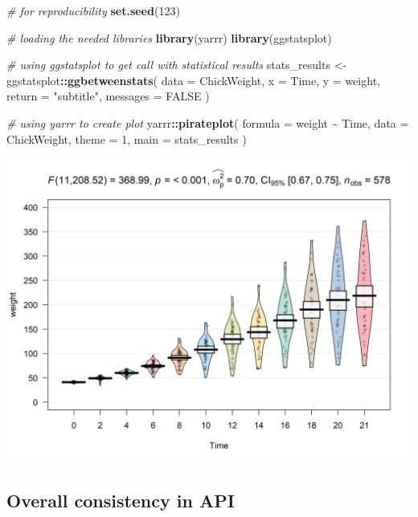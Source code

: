 \documentclass[
]{article}
\newenvironment{Shaded}{\begin{snugshade}}{\end{snugshade}}
\newcommand{\CommentTok}[1]{\textcolor[rgb]{0.56,0.35,0.01}{\textit{#1}}}
\newcommand{\DataTypeTok}[1]{\textcolor[rgb]{0.13,0.29,0.53}{#1}}
\newcommand{\DecValTok}[1]{\textcolor[rgb]{0.00,0.00,0.81}{#1}}
\newcommand{\KeywordTok}[1]{\textcolor[rgb]{0.13,0.29,0.53}{\textbf{#1}}}
\newcommand{\NormalTok}[1]{#1}
\newcommand{\OperatorTok}[1]{\textcolor[rgb]{0.81,0.36,0.00}{\textbf{#1}}}
\newcommand{\OtherTok}[1]{\textcolor[rgb]{0.56,0.35,0.01}{#1}}
\newcommand{\StringTok}[1]{\textcolor[rgb]{0.31,0.60,0.02}{#1}}
\begin{document}
\begin{Shaded}
\begin{Highlighting}[]
\CommentTok{\# for reproducibility}
\KeywordTok{set.seed}\NormalTok{(}\DecValTok{123}\NormalTok{)}

\CommentTok{\# loading the needed libraries}
\KeywordTok{library}\NormalTok{(yarrr)}
\KeywordTok{library}\NormalTok{(ggstatsplot)}

\CommentTok{\# using \textasciigrave{}ggstatsplot\textasciigrave{} to get call with statistical results}
\NormalTok{stats\_results <{-}}
\StringTok{  }\NormalTok{ggstatsplot}\OperatorTok{::}\KeywordTok{ggbetweenstats}\NormalTok{(}
    \DataTypeTok{data =}\NormalTok{ ChickWeight,}
    \DataTypeTok{x =}\NormalTok{ Time,}
    \DataTypeTok{y =}\NormalTok{ weight,}
    \DataTypeTok{return =} \StringTok{"subtitle"}\NormalTok{,}
    \DataTypeTok{messages =} \OtherTok{FALSE}
\NormalTok{  )}

\CommentTok{\# using \textasciigrave{}yarrr\textasciigrave{} to create plot}
\NormalTok{yarrr}\OperatorTok{::}\KeywordTok{pirateplot}\NormalTok{(}
  \DataTypeTok{formula =}\NormalTok{ weight }\OperatorTok{\textasciitilde{}}\StringTok{ }\NormalTok{Time,}
  \DataTypeTok{data =}\NormalTok{ ChickWeight,}
  \DataTypeTok{theme =} \DecValTok{1}\NormalTok{,}
  \DataTypeTok{main =}\NormalTok{ stats\_results}
\NormalTok{)}
\end{Highlighting}
\end{Shaded}

\includegraphics[width=1\linewidth]{./figures/paper-pirateplot-1}

\hypertarget{overall-consistency-in-api}{%
\subsection{Overall consistency in API}\label{overall-consistency-in-api}}
\end{document}
